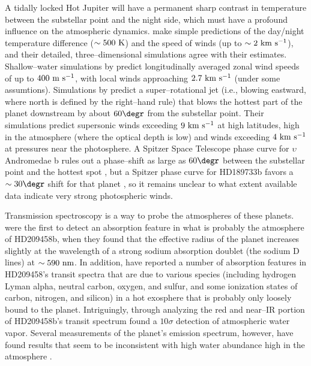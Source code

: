 \documentclass[12pt,preprint]{aastex}
\begin{document}
A tidally locked Hot Jupiter will have a permanent sharp contrast in
temperature between the substellar point and the night side, which must
have a profound influence on the atmospheric dynamics.  
\citet{showman+guillot2002} make simple predictions of the day/night
temperature difference ($\sim 500 {\rm ~K}$) and the speed of winds (up
to $\sim 2 {\rm ~km~s^{-1}}$), and their detailed, three--dimensional
simulations agree with their estimates.  Shallow--water simulations by
\citet{cho_et_al2003} predict longitudinally averaged zonal wind speeds
of up to $400 {\rm~m~s^{-1}}$, with local winds approaching
$2.7 {\rm~km~s^{-1}}$ (under some assumtions).  Simulations by
\citet{cooper+showman2005}
predict a super--rotational jet (i.e., blowing eastward, where north is
defined by the right--hand rule) that blows the hottest part of the planet
downstream by about $60\degr$ from the substellar point.  Their simulations
predict supersonic winds exceeding $9 {\rm~km~s^{-1}}$ at high latitudes,
high in the atmosphere (where the optical depth is low) and winds exceeding
$4 {\rm~km~s^{-1}}$ at pressures near the photosphere.  A Spitzer Space
Telescope phase curve for $\upsilon$ Andromedae b rules out a phase--shift
as large as $60\degr$ between the substellar point and the hottest
spot \citep{harrington_et_al2006}, but a Spitzer phase curve for
HD189733b favors a $\sim 30\degr$ shift for that planet
\citep{knutson_et_al2007b}, so it remains unclear to what extent available
data indicate very strong photospheric winds.

Transmission spectroscopy is a way to probe the atmospheres of these planets.
\citet{charbonneau_et_al2002} were the first to detect an absorption feature
in what is probably the atmosphere of HD209458b, when they found that the
effective radius of the planet increases slightly at the wavelength of a
strong sodium absorption doublet (the sodium D lines) at $\sim 590 {\rm~nm}$.
In addition, \citet{vidal-madjar_et_al2003, vidal-madjar_et_al2004} have
reported a number of absorption features in HD209458's transit spectra that
are due to various species (including hydrogen Lyman alpha, neutral carbon,
oxygen, and sulfur, and some ionization states of carbon, nitrogen, and
silicon) in a hot exosphere that is probably only loosely bound to the planet.
Intriguingly, through analyzing the red and near--IR portion of HD209458b's
transit spectrum \citet{barman2007} found a $10 \sigma$ detection of
atmospheric water vapor.  Several measurements of the planet's emission
spectrum, however, have found results that seem to be inconsistent with
high water abundance high in the atmosphere \citep{grillmair_et_al2007,
richardson_et_al2007, swain_et_al2007}.
\end{document}
